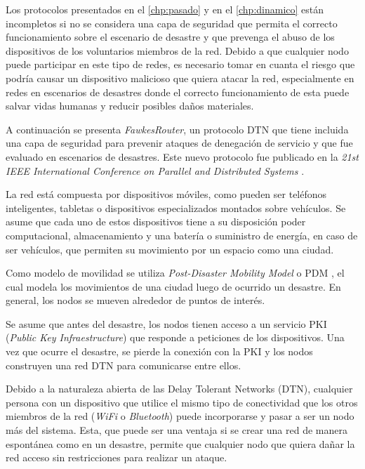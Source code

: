 \newcommand{\ticket}{\textit{ticket}}
\newcommand{\tickets}{\textit{tickets}}

Los protocolos presentados en el \ref{chp:pasado} y en el \ref{chp:dinamico}
están incompletos si no se considera una capa de seguridad que permita el
correcto funcionamiento sobre el escenario de desastre y que prevenga el abuso
de los dispositivos de los voluntarios miembros de la red. Debido a que cualquier
nodo puede participar en este tipo de redes, es necesario tomar en cuanta el
riesgo que podría causar un dispositivo malicioso que quiera atacar la red,
especialmente en redes en escenarios de desastres donde el correcto
funcionamiento de esta puede salvar vidas humanas y reducir posibles daños materiales.


A continuación se presenta \textit{FawkesRouter}, un protocolo DTN que tiene
incluida una capa de seguridad para prevenir ataques de denegación de servicio y
que fue evaluado en escenarios de desastres. Este nuevo protocolo fue publicado
en la \textit{21st IEEE International Conference on Parallel and Distributed
Systems} \cite{DBLP:conf/icpads/GarayRH15}.



La red está compuesta por dispositivos móviles, como pueden ser teléfonos
inteligentes, tabletas o dispositivos especializados montados sobre vehículos.
Se asume que cada uno de estos dispositivos tiene a su disposición poder
computacional, almacenamiento y una batería o suministro de energía, en caso de
ser vehículos, que permiten su movimiento por un espacio como una ciudad.

Como modelo de movilidad se utiliza \textit{Post-Disaster Mobility Model} o PDM
\cite{uddin_post-disaster_2009}, el cual modela los movimientos de una ciudad
luego de ocurrido un desastre. En general, los nodos se mueven alrededor de
puntos de interés.

Se asume que antes del desastre, los nodos tienen acceso a un servicio PKI
(\textit{Public Key Infraestructure}) \cite{pki} que responde a peticiones de
los dispositivos.  Una vez que ocurre el desastre, se pierde la conexión con la
PKI y los nodos construyen una red DTN para comunicarse entre ellos.


Debido a la naturaleza abierta de las Delay Tolerant Networks (DTN), cualquier
persona con un dispositivo que utilice el mismo tipo de conectividad que los
otros miembros de la red (\textit{WiFi} o \textit{Bluetooth}) puede incorporarse
y pasar a ser un nodo más del sistema. Esta, que puede ser una ventaja si se
crear una red de manera espontánea como en un desastre, permite que cualquier
nodo que quiera dañar la red acceso sin restricciones para realizar un ataque.

